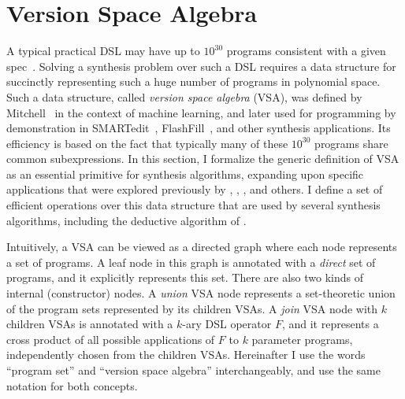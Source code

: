 \chapter{Version Space Algebra}
\label{ch:vsa}

A typical practical DSL may have up to $10^{30}$ programs consistent with a given spec~\cite{vldb12:semantic}.
Solving a synthesis problem over such a DSL requires a data structure for succinctly representing such a huge number of
programs in polynomial space.
Such a data structure, called \emph{version space algebra} (VSA),
was defined by Mitchell~\cite{vsa:Mitchell} in the context of machine learning, and later used for programming by demonstration in
SMARTedit~\cite{lau:smartedit}, FlashFill~\cite{flashfill}, and other synthesis applications.
Its efficiency is based on the fact that typically many of these $10^{30}$ programs share common subexpressions.
In this section, I formalize the generic definition of VSA as an essential primitive for synthesis algorithms, expanding
upon specific applications that were explored previously by \citeauthor{vsa:Mitchell}, \citeauthor{lau:smartedit},
\citeauthor{flashfill}, and others.
I define a set of efficient operations over this data structure that are used by several synthesis algorithms,
including the deductive algorithm of \PROSE.

Intuitively, a VSA can be viewed as a directed graph where each node represents a set of programs.
A leaf node in this graph is annotated with a \emph{direct} set of programs, and it explicitly represents this set.
There are also two kinds of internal (constructor) nodes.
A \emph{union} VSA node represents a set-theoretic union of the program sets represented by its children VSAs.
A \emph{join} VSA node with $k$ children VSAs is annotated with a $k$-ary DSL operator $F$, and it represents a cross
product of all possible applications of $F$ to $k$ parameter programs, independently chosen from the children VSAs.
Hereinafter I use the words ``program set'' and ``version space algebra'' interchangeably, and use the same notation for both concepts.

